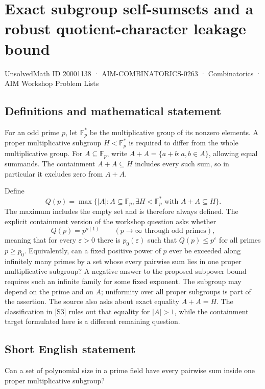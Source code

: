 \documentclass[11pt,a4paper]{article}
\begin{document}
\section*{Exact subgroup self-sumsets and a robust quotient-character leakage bound}\label{20001138}
{\small UnsolvedMath ID 20001138 · AIM-COMBINATORICS-0263 · Combinatorics · AIM Workshop Problem Lists}
\subsection{Definitions and mathematical statement}
For an odd prime $p$, let $\mathbb F_p^*$ be the multiplicative group of its nonzero elements.
A proper multiplicative subgroup $H<\mathbb F_p^*$ is required to differ from the whole multiplicative group.
For $A\subseteq\mathbb F_p$, write
$A+A=\{a+b:a,b\in A\}$, allowing equal summands.
The containment $A+A\subseteq H$ includes every such sum, so in particular it excludes zero from $A+A$.

Define
\[
 Q(p)=\max\{|A|:A\subseteq\mathbb F_p,
       \exists H<\mathbb F_p^*\text{ with }A+A\subseteq H\}.
\]
The maximum includes the empty set and is therefore always defined.
The explicit containment version of the workshop question asks whether
\[
 Q(p)=p^{o(1)}\qquad(p\to\infty\text{ through odd primes}),
\]
meaning that for every $\varepsilon>0$ there is $p_0(\varepsilon)$ such that $Q(p)\leq p^\varepsilon$ for all primes $p\geq p_0$.
Equivalently, can a fixed positive power of $p$ ever be exceeded along infinitely many primes by a set whose every pairwise sum lies in one proper multiplicative subgroup?
A negative answer to the proposed subpower bound requires such an infinite family for some fixed exponent.
The subgroup may depend on the prime and on $A$; uniformity over all proper subgroups is part of the assertion.
The source also asks about exact equality $A+A=H$. The classification in [S3] rules out that equality for $|A|>1$, while the containment target formulated here is a different remaining question.
\subsection{Short English statement}
Can a set of polynomial size in a prime field have every pairwise sum inside one proper multiplicative subgroup?
\end{document}
